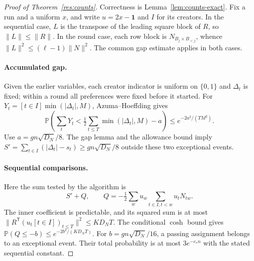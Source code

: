 \documentclass[11pt,a4paper]{article}
\theoremstyle{definition}
\theoremstyle{remark}
\newcommand{\Prb}{\mathbb P}
\newcommand{\ind}{\mathbf 1}
\begin{document}
\begin{proof}[Proof of Theorem~\ref{res:counts}]
Correctness is Lemma~\ref{lem:counts-exact}. Fix a run and a uniform $x$,
and write $u=2x-\ind$ and $I$ for its creators. In the sequential case,
$L$ is the transpose of the leading square block of $R$, so $\|L\|\le\|R\|$.
In the round case, each row block is $N_{B_j\times B_{<j}}$, whence
$\|L\|^2\le(\ell-1)\|N\|^2$. The common gap estimate applies in both cases.

\paragraph{Accumulated gap.}
Given the earlier variables, each creator indicator is uniform on $\{0,1\}$ and
$\Delta_t$ is fixed; within a round all preferences were fixed before it
started. For $Y_t=[t\in I]\min(|\Delta_t|,M)$, Azuma--Hoeffding gives
\[
 \Prb\left(\sum_tY_t<\tfrac12\sum_{t\le T}\min(|\Delta_t|,M)-a\right)
 \le e^{-2a^2/(TM^2)}.
\]
Use $a=gn\sqrt{D_N}/8$. The gap lemma and the allowance bound imply
$S'=\sum_{t\in I}(|\Delta_t|-s_t)\ge gn\sqrt{D_N}/8$
outside these two exceptional events.

\paragraph{Sequential comparisons.}
Here the sum tested by the algorithm is
\begin{equation}
 S'+Q,\qquad Q=-\tfrac12\sum_wu_w\sum_{t\in I,t<w}u_tN_{tw}.
                                                        \label{eq:counts-race}
\end{equation}
The inner coefficient is predictable, and its squared sum is at most
$\|R^{\mathsf T}(u_t[t\in I])_{t\le T}\|^2\le KD_NT$.
The conditional $\cosh$ bound gives
$\Prb(Q\le-b)\le e^{-2b^2/(KD_NT)}$.
For $b=gn\sqrt{D_N}/16$, a passing assignment belongs to an exceptional
event. Their total probability is at most $3e^{-c_*n}$ with the stated
sequential constant.


\end{proof}
\end{document}
